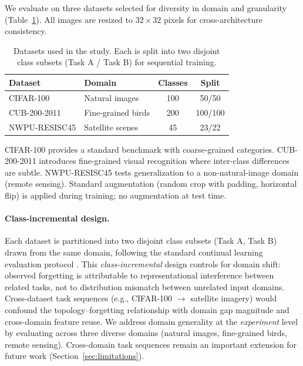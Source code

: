 \documentclass[10pt,twocolumn]{article}
\begin{document}
We evaluate on three datasets selected for diversity in domain and granularity (Table~\ref{tab:datasets}). All images are resized to $32 \times 32$ pixels for cross-architecture consistency.

\begin{table}[t]
\centering
\caption{Datasets used in the study. Each is split into two disjoint class subsets (Task A / Task B) for sequential training.}
\label{tab:datasets}
\small
\setlength{\tabcolsep}{3pt}
\begin{tabular}{@{}llcc@{}}
\toprule
Dataset & Domain & Classes & Split \\
\midrule
CIFAR-100 & Natural images & 100 & 50/50 \\
CUB-200-2011 & Fine-grained birds & 200 & 100/100 \\
NWPU-RESISC45 & Satellite scenes & 45 & 23/22 \\
\bottomrule
\end{tabular}
\end{table}

CIFAR-100 provides a standard benchmark with coarse-grained categories. CUB-200-2011 \citep{wah2011caltech} introduces fine-grained visual recognition where inter-class differences are subtle. NWPU-RESISC45 \citep{cheng2017remote} tests generalization to a non-natural-image domain (remote sensing). Standard augmentation (random crop with padding, horizontal flip) is applied during training; no augmentation at test time.

\paragraph{Class-incremental design.}
Each dataset is partitioned into two disjoint class subsets (Task A, Task B) drawn from the same domain, following the standard continual learning evaluation protocol \citep{kirkpatrick2017overcoming, zenke2017continual, rebuffi2017icarl}. This \emph{class-incremental} design controls for domain shift: observed forgetting is attributable to representational interference between related tasks, not to distribution mismatch between unrelated input domains. Cross-dataset task sequences (e.g., CIFAR-100 $\rightarrow$ satellite imagery) would confound the topology--forgetting relationship with domain gap magnitude and cross-domain feature reuse. We address domain generality at the \emph{experiment} level by evaluating across three diverse domains (natural images, fine-grained birds, remote sensing). Cross-domain task sequences remain an important extension for future work (Section~\ref{sec:limitations}).
\end{document}
